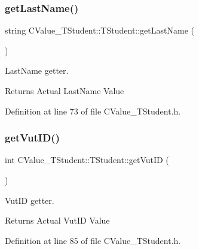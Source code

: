\subsubsection{\texorpdfstring{get\+Last\+Name()}{getLastName()}}
{\footnotesize\ttfamily string C\+Value\+\_\+\+T\+Student\+::\+T\+Student\+::get\+Last\+Name (\begin{DoxyParamCaption}{ }\end{DoxyParamCaption})\hspace{0.3cm}{\ttfamily [inline]}}



Last\+Name getter. 

\begin{DoxyReturn}{Returns}
Actual {\ttfamily Last\+Name} {\ttfamily Value} 
\end{DoxyReturn}


Definition at line 73 of file C\+Value\+\_\+\+T\+Student.\+h.

\mbox{\label{class_c_value___t_student_1_1_t_student_a1cbaa40be181be3211ea886b429bde3d}} 
\subsubsection{\texorpdfstring{get\+Vut\+I\+D()}{getVutID()}}
{\footnotesize\ttfamily int C\+Value\+\_\+\+T\+Student\+::\+T\+Student\+::get\+Vut\+ID (\begin{DoxyParamCaption}{ }\end{DoxyParamCaption})\hspace{0.3cm}{\ttfamily [inline]}}



Vut\+ID getter. 

\begin{DoxyReturn}{Returns}
Actual {\ttfamily Vut\+ID} {\ttfamily Value} 
\end{DoxyReturn}


Definition at line 85 of file C\+Value\+\_\+\+T\+Student.\+h.

\mbox{\label{class_c_value___t_student_1_1_t_student_a7f152b4b97a89d81f06be6bc311d8886}} 
